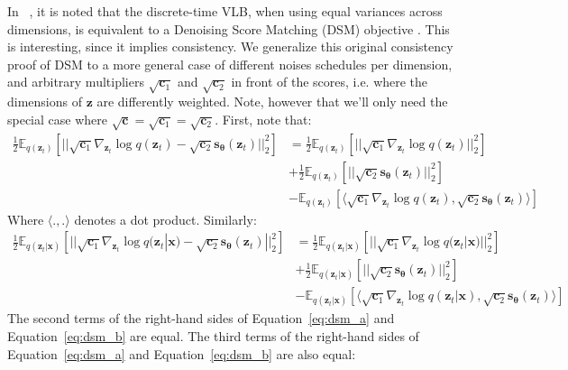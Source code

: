 \documentclass{article}
\def\Eqref#1{Equation~\ref{#1}}
\def\rvc{{\mathbf{c}}}
\def\rvx{{\mathbf{x}}}
\def\rvz{{\mathbf{z}}}
\newcommand{\E}{\mathbb{E}}
\newcommand{\bT}{{\boldsymbol{\theta}}}
\newcommand{\snT}{\mathbf{s}_{\bT}}
\begin{document}
In ~\citep{ho2020denoising}, it is noted that the discrete-time VLB, when using equal variances across dimensions, is equivalent to a Denoising Score Matching (DSM) objective \citep{vincent2011connection}. This is interesting, since it implies consistency. We generalize this original consistency proof of DSM to a more general case of different noises schedules per dimension, and arbitrary multipliers $\sqrt{\rvc_1}$ and $\sqrt{\rvc_2}$ in front of the scores, i.e. where the dimensions of $\rvz$ are differently weighted. Note, however that we'll only need the special case where $\sqrt{\rvc}=\sqrt{\rvc_1}=\sqrt{\rvc_2}$. 
First, note that:
\begin{align}
\tfrac{1}{2} \E_{q(\rvz_t)} \left[ ||\sqrt{\rvc_1}\nabla_{\rvz_t} \log q(\rvz_t) - \sqrt{\rvc_2}\snT(\rvz_t)||_2^2 \right]
&= \tfrac{1}{2} \E_{q(\rvz_t)} \left[ ||\sqrt{\rvc_1}\nabla_{\rvz_t} \log q(\rvz_t)||_2^2 \right]
\nonumber\\
&+ \tfrac{1}{2} \E_{q(\rvz_t)} \left[ ||\sqrt{\rvc_2}\snT(\rvz_t)||_2^2 \right]
\nonumber\\
&- \E_{q(\rvz_t)} \left[ \langle \sqrt{\rvc_1} \nabla_{\rvz_t} \log q(\rvz_t), \sqrt{\rvc_2}\snT(\rvz_t) \rangle \right]
\label{eq:dsm_a}
\end{align}
Where $\langle ., . \rangle$ denotes a dot product. Similarly:
\begin{align}
\tfrac{1}{2} \E_{q(\rvz_t|\rvx)} \left[ ||\sqrt{\rvc_1}\nabla_{\rvz_t} \log q(\rvz_t|\rvx) - \sqrt{\rvc_2}\snT(\rvz_t)||_2^2 \right]
&= \tfrac{1}{2} \E_{q(\rvz_t|\rvx)} \left[ ||\sqrt{\rvc_1}\nabla_{\rvz_t} \log q(\rvz_t|\rvx)||_2^2 \right]
\nonumber\\
&+ \tfrac{1}{2} \E_{q(\rvz_t|\rvx)} \left[ ||\sqrt{\rvc_2}\snT(\rvz_t)||_2^2 \right]
\nonumber\\
&- \E_{q(\rvz_t|\rvx)} \left[ \langle \sqrt{\rvc_1}\nabla_{\rvz_t} \log q(\rvz_t|\rvx), \sqrt{\rvc_2}\snT(\rvz_t) \rangle \right]
\label{eq:dsm_b}
\end{align}
The second terms of the right-hand sides of \Eqref{eq:dsm_a} and \Eqref{eq:dsm_b} are equal. The third terms of the right-hand sides of \Eqref{eq:dsm_a} and \Eqref{eq:dsm_b} are also equal:
\end{document}
